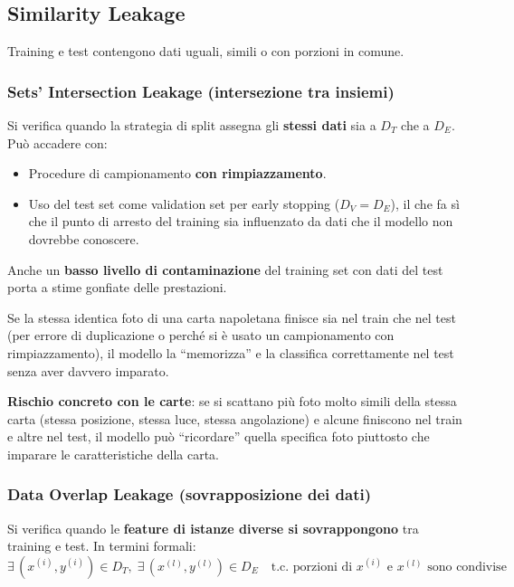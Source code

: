 \documentclass[a4paper,12pt]{article}
\begin{document}
\subsection{Similarity Leakage}

Training e test contengono dati uguali, simili o con porzioni in comune.

\subsubsection{Sets' Intersection Leakage (intersezione tra insiemi)}

Si verifica quando la strategia di split assegna gli \textbf{stessi dati} sia a $D_T$ che a $D_E$. Può accadere con:
\begin{itemize}
    \item Procedure di campionamento \textbf{con rimpiazzamento}.
    \item Uso del test set come validation set per early stopping ($D_V = D_E$), il che fa sì che il punto di arresto del training sia influenzato da dati che il modello non dovrebbe conoscere.
\end{itemize}

Anche un \textbf{basso livello di contaminazione} del training set con dati del test porta a stime gonfiate delle prestazioni.

\begin{esempio}
Se la stessa identica foto di una carta napoletana finisce sia nel train che nel test (per errore di duplicazione o perché si è usato un campionamento con rimpiazzamento), il modello la ``memorizza'' e la classifica correttamente nel test senza aver davvero imparato.

\textbf{Rischio concreto con le carte}: se si scattano più foto molto simili della stessa carta (stessa posizione, stessa luce, stessa angolazione) e alcune finiscono nel train e altre nel test, il modello può ``ricordare'' quella specifica foto piuttosto che imparare le caratteristiche della carta.
\end{esempio}

\subsubsection{Data Overlap Leakage (sovrapposizione dei dati)}

Si verifica quando le \textbf{feature di istanze diverse si sovrappongono} tra training e test. In termini formali:
$$\exists\, (x^{(i)}, y^{(i)}) \in D_T,\; \exists\, (x^{(l)}, y^{(l)}) \in D_E \quad \text{t.c. porzioni di } x^{(i)} \text{ e } x^{(l)} \text{ sono condivise}$$
\end{document}
